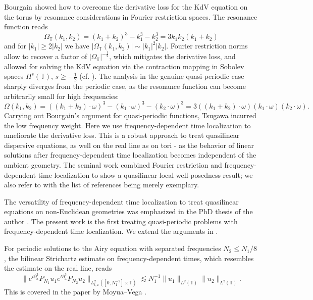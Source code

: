 \documentclass{amsart}
\theoremstyle{definition}
\newcommand{\T}{\mathbb{T}}
\begin{document}
Bourgain \cite{Bourgain1993KdV} showed how to overcome the derivative loss for the KdV equation on the torus by resonance considerations in Fourier restriction spaces. The resonance function reads
\begin{equation*}
\Omega_{\T}(k_1,k_2) = (k_1+k_2)^3 -k_1^3 - k_2^3 = 3 k_1 k_2(k_1+k_2)
\end{equation*}
and for $|k_1| \geq 2|k_2|$ we have $|\Omega_{\T}(k_1,k_2)| \sim |k_1|^2 |k_2|$. Fourier restriction norms allow to recover a factor of $|\Omega_{\T}|^{-\frac{1}{2}}$, which mitigates the derivative loss, and allowed for solving the KdV equation via the contraction mapping in Sobolev spaces $H^{s}(\T)$, $s\geq - \frac{1}{2}$ (cf. \cite[Theorem~1.8]{KenigPonceVega1996}).
The analysis in the genuine quasi-periodic case sharply diverges from the periodic case, as the resonance function can become arbitrarily small for high frequencies:
\begin{equation*}
\Omega(k_1,k_2) = ((k_1+k_2) \cdot \omega)^3 - (k_1 \cdot \omega)^3 - (k_2 \cdot \omega)^3 = 3( (k_1+k_2)\cdot \omega) (k_1 \cdot \omega) (k_2 \cdot \omega).
\end{equation*}
Carrying out Bourgain's argument for quasi-periodic functions, Tsugawa incurred the low frequency weight.
Here we use frequency-dependent time localization to ameliorate the derivative loss. This is a robust approach to treat quasilinear dispersive equations, as well on the real line as on tori - as the behavior of linear solutions after frequency-dependent time localization becomes independent of the ambient geometry. The seminal work \cite{IonescuKenigTataru2008} combined Fourier restriction and frequency-dependent time localization to show a quasilinear local well-posedness result; we also refer to  \cite{BurqGerardTzvetkov2004,KochTzvetkov2003,KochTataru2007} with the list of references being merely exemplary. 

\smallskip

The versatility of frequency-dependent time localization to treat quasilinear equations on non-Euclidean geometries was emphasized in the PhD thesis of the author \cite{ShorttimeFourierTransformRestriction}. The present work is the first treating quasi-periodic problems with frequency-dependent time localization. We extend the arguments in \cite{Schippa2025Quasiperiodic,ShorttimeFourierTransformRestriction}. 

For periodic solutions to the Airy equation with separated frequencies $N_2 \leq N_1/8$, the bilinear Strichartz estimate on frequency-dependent times, which resembles the estimate on the real line, reads
\begin{equation*}
\| e^{t \partial_x^3} P_{N_1} u_1 e^{t \partial_x^3} P_{N_2} u_2 \|_{L^2_{t,x}([0,N_1^{-2}] \times \T)} \lesssim N_1^{-1} \| u_1 \|_{L^2(\T)} \| u_2 \|_{L^2(\T)}.
\end{equation*}
This is covered in the paper by Moyua--Vega \cite{MoyuaVega2008}. 
\end{document}
